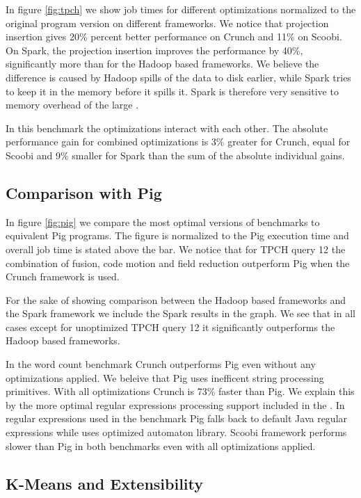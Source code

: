 In figure \ref{fig:tpch} we show job times for different optimizations normalized to the original program version on different frameworks. We notice that projection insertion gives 20\% percent better performance on Crunch and 11\% on Scoobi. On Spark, the projection insertion improves the performance by 40\%, significantly more than for the Hadoop based frameworks. We believe the difference is caused by Hadoop spills of the data to disk earlier, while Spark tries to keep it in the memory before it spills it. Spark is therefore very sensitive to memory overhead of the large .

In this benchmark the optimizations interact with each other. The absolute performance gain for combined optimizations is 3\% greater for Crunch, equal for Scoobi and 9\% smaller for Spark than the sum of the absolute individual gains.

\subsection{Comparison with Pig}
\label{subsec:pig}

In figure \ref{fig:pig} we compare the most optimal versions of benchmarks to equivalent Pig programs. The figure is normalized to the Pig execution time and overall job time is stated above the bar. We notice that for TPCH query 12 the combination of fusion, code motion and field reduction outperform Pig when the Crunch framework is used. 

For the sake of showing comparison between the Hadoop based frameworks and the Spark framework we include the Spark results in the graph. We see that in all cases except for unoptimized TPCH query 12 it significantly outperforms the Hadoop based frameworks.

In the word count benchmark Crunch outperforms Pig even without any optimizations applied. We beleive that Pig uses inefficent string processing primitives. With all optimizations Crunch is 73\% faster than Pig. We explain this by the more optimal regular expressions processing support included in the \tool. In regular expressions used in the benchmark Pig falls back to default Java regular expressions while \tool uses optimized automaton library. Scoobi framework performs slower than Pig in both benchmarks even with all optimizations applied.


\subsection{K-Means and Extensibility}
\label{subsec:kmeans}

